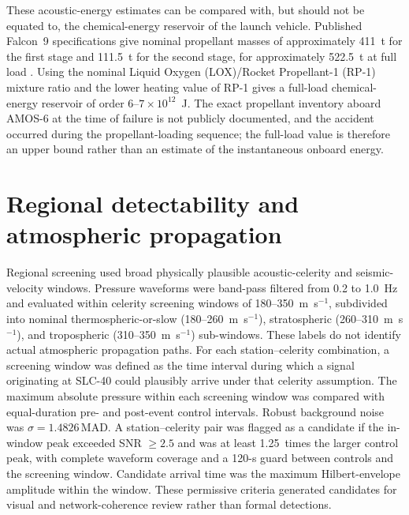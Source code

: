 \documentclass[]{seismica}
\begin{document}
These acoustic-energy estimates can be compared with, but should not be
equated to, the chemical-energy reservoir of the launch vehicle. Published
Falcon~9 specifications give nominal propellant masses of approximately
411~t for the first stage and 111.5~t for the second stage, for approximately
522.5~t at full load
\citep{falcon9_userguide_2015}. Using the nominal Liquid Oxygen (LOX)/Rocket
Propellant-1 (RP-1) mixture ratio and the lower heating value of RP-1
\citep{sutton_biblarz_2017} gives a full-load chemical-energy reservoir of order
$6$--$7\times10^{12}$~J. The exact propellant inventory aboard AMOS-6 at the
time of failure is not publicly documented, and the accident occurred during
the propellant-loading sequence; the full-load value is therefore an upper
bound rather than an estimate of the instantaneous onboard energy.


\section{Regional detectability and atmospheric propagation}
\label{sec:regional}

Regional screening used broad physically plausible acoustic-celerity and
seismic-velocity windows. Pressure waveforms were band-pass filtered from 0.2
to 1.0~Hz and evaluated within celerity screening windows of
180--350~m~s$^{-1}$, subdivided into nominal thermospheric-or-slow
(180--260~m~s$^{-1}$), stratospheric (260--310~m~s$^{-1}$), and tropospheric
(310--350~m~s$^{-1}$) sub-windows. These labels do not identify actual
atmospheric propagation paths. For each station--celerity combination, a
screening window was defined as the time interval during which a signal
originating at SLC-40 could plausibly arrive under that celerity assumption.
The maximum absolute pressure within each screening window was compared with
equal-duration pre- and post-event control intervals. Robust background noise
was $\sigma=1.4826\,\mathrm{MAD}$. A station--celerity pair was flagged as a
candidate if the in-window peak exceeded SNR $\geq2.5$ and was at least
1.25~times the larger control peak, with complete waveform coverage and a
120-s guard between controls and the screening window. Candidate arrival time
was the maximum Hilbert-envelope amplitude within the window. These permissive
criteria generated candidates for visual and network-coherence review rather
than formal detections.
\end{document}
